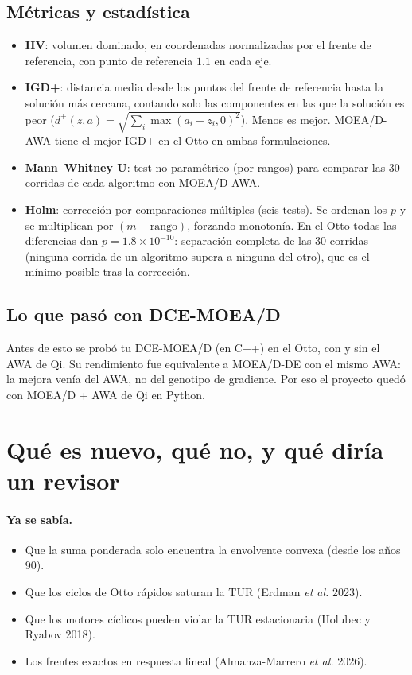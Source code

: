 \subsection{Métricas y estadística}

\begin{itemize}
\item \textbf{HV}: volumen dominado, en coordenadas normalizadas por el frente de referencia, con
  punto de referencia $1.1$ en cada eje.
\item \textbf{IGD+}: distancia media desde los puntos del frente de referencia hasta la solución más
  cercana, contando solo las componentes en las que la solución es peor
  ($d^+(z,a) = \sqrt{\sum_i\max(a_i - z_i, 0)^2}$). Menos es mejor. MOEA/D-AWA tiene el mejor IGD+
  en el Otto en ambas formulaciones.
\item \textbf{Mann--Whitney U}: test no paramétrico (por rangos) para comparar las 30 corridas de cada
  algoritmo con MOEA/D-AWA.
\item \textbf{Holm}: corrección por comparaciones múltiples (seis tests). Se ordenan los $p$ y se
  multiplican por $(m - \text{rango})$, forzando monotonía. En el Otto todas las diferencias dan
  $p = 1.8\times10^{-10}$: separación completa de las 30 corridas (ninguna corrida de un algoritmo
  supera a ninguna del otro), que es el mínimo posible tras la corrección.
\end{itemize}

\subsection{Lo que pasó con DCE-MOEA/D}

Antes de esto se probó tu DCE-MOEA/D (en C++) en el Otto, con y sin el AWA de Qi. Su rendimiento
fue equivalente a MOEA/D-DE con el mismo AWA: la mejora venía del AWA, no del genotipo de gradiente.
Por eso el proyecto quedó con MOEA/D + AWA de Qi en Python.

\section{Qué es nuevo, qué no, y qué diría un revisor}

\paragraph{Ya se sabía.}
\begin{itemize}
\item Que la suma ponderada solo encuentra la envolvente convexa (desde los años 90).
\item Que los ciclos de Otto rápidos saturan la TUR (Erdman \emph{et al.} 2023).
\item Que los motores cíclicos pueden violar la TUR estacionaria (Holubec y Ryabov 2018).
\item Los frentes exactos en respuesta lineal (Almanza-Marrero \emph{et al.} 2026).
\end{itemize}


